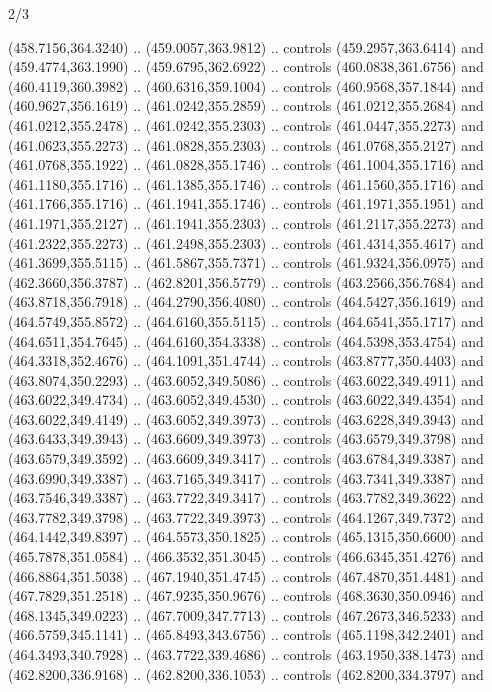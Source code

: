 \begin{flagdescription}{2/3}
\begin{scope}[xshift=0.5\flaglength,yshift=0.5\flagwidth,scale=\flagwidth/495.65]
\begin{scope}[y=0.8pt, x=0.8pt, yscale=-1,shift={(-463.76,-309.78)}]
  (458.7156,364.3240) .. (459.0057,363.9812) .. controls (459.2957,363.6414) and
  (459.4774,363.1990) .. (459.6795,362.6922) .. controls (460.0838,361.6756) and
  (460.4119,360.3982) .. (460.6316,359.1004) .. controls (460.9568,357.1844) and
  (460.9627,356.1619) .. (461.0242,355.2859) .. controls (461.0212,355.2684) and
  (461.0212,355.2478) .. (461.0242,355.2303) .. controls (461.0447,355.2273) and
  (461.0623,355.2273) .. (461.0828,355.2303) .. controls (461.0768,355.2127) and
  (461.0768,355.1922) .. (461.0828,355.1746) .. controls (461.1004,355.1716) and
  (461.1180,355.1716) .. (461.1385,355.1746) .. controls (461.1560,355.1716) and
  (461.1766,355.1716) .. (461.1941,355.1746) .. controls (461.1971,355.1951) and
  (461.1971,355.2127) .. (461.1941,355.2303) .. controls (461.2117,355.2273) and
  (461.2322,355.2273) .. (461.2498,355.2303) .. controls (461.4314,355.4617) and
  (461.3699,355.5115) .. (461.5867,355.7371) .. controls (461.9324,356.0975) and
  (462.3660,356.3787) .. (462.8201,356.5779) .. controls (463.2566,356.7684) and
  (463.8718,356.7918) .. (464.2790,356.4080) .. controls (464.5427,356.1619) and
  (464.5749,355.8572) .. (464.6160,355.5115) .. controls (464.6541,355.1717) and
  (464.6511,354.7645) .. (464.6160,354.3338) .. controls (464.5398,353.4754) and
  (464.3318,352.4676) .. (464.1091,351.4744) .. controls (463.8777,350.4403) and
  (463.8074,350.2293) .. (463.6052,349.5086) .. controls (463.6022,349.4911) and
  (463.6022,349.4734) .. (463.6052,349.4530) .. controls (463.6022,349.4354) and
  (463.6022,349.4149) .. (463.6052,349.3973) .. controls (463.6228,349.3943) and
  (463.6433,349.3943) .. (463.6609,349.3973) .. controls (463.6579,349.3798) and
  (463.6579,349.3592) .. (463.6609,349.3417) .. controls (463.6784,349.3387) and
  (463.6990,349.3387) .. (463.7165,349.3417) .. controls (463.7341,349.3387) and
  (463.7546,349.3387) .. (463.7722,349.3417) .. controls (463.7782,349.3622) and
  (463.7782,349.3798) .. (463.7722,349.3973) .. controls (464.1267,349.7372) and
  (464.1442,349.8397) .. (464.5573,350.1825) .. controls (465.1315,350.6600) and
  (465.7878,351.0584) .. (466.3532,351.3045) .. controls (466.6345,351.4276) and
  (466.8864,351.5038) .. (467.1940,351.4745) .. controls (467.4870,351.4481) and
  (467.7829,351.2518) .. (467.9235,350.9676) .. controls (468.3630,350.0946) and
  (468.1345,349.0223) .. (467.7009,347.7713) .. controls (467.2673,346.5233) and
  (466.5759,345.1141) .. (465.8493,343.6756) .. controls (465.1198,342.2401) and
  (464.3493,340.7928) .. (463.7722,339.4686) .. controls (463.1950,338.1473) and
  (462.8200,336.9168) .. (462.8200,336.1053) .. controls (462.8200,334.3797) and

\end{scope}
\end{scope}
\end{flagdescription}
